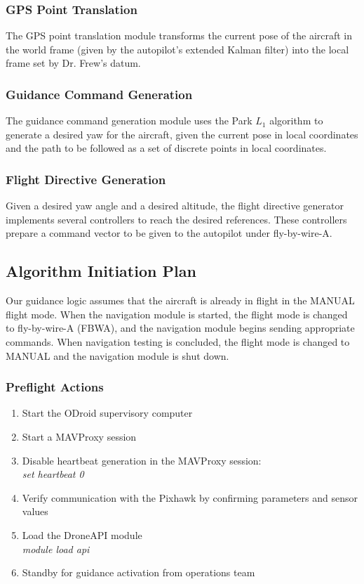 \documentclass{aiaa}
\begin{document}
\subsubsection{GPS Point Translation}
The GPS point translation module transforms the current pose of the aircraft in the world frame (given by the autopilot's extended Kalman filter) into the local frame set by Dr. Frew's datum.
  
\subsubsection{Guidance Command Generation}
The guidance command generation module uses the Park $L_1$ algorithm to generate a desired yaw for the aircraft, given the current pose in local coordinates and the path to be followed as a set of discrete points in local coordinates.

\subsubsection{Flight Directive Generation}
Given a desired yaw angle and a desired altitude, the flight directive generator implements several controllers to reach the desired references. These controllers prepare a command vector to be given to the autopilot under fly-by-wire-A. 
 
\subsection{Algorithm Initiation Plan}
Our guidance logic assumes that the aircraft is already in flight in the MANUAL flight mode. When the navigation module is started, the flight mode is changed to fly-by-wire-A (FBWA), and the navigation module begins sending appropriate commands. When navigation testing is concluded, the flight mode is changed to MANUAL and the navigation module is shut down.

\subsubsection{Preflight Actions}
\begin{enumerate}
	\item Start the ODroid supervisory computer
	\item Start a MAVProxy session
	\item Disable heartbeat generation in the MAVProxy session: \\
	\textit{set heartbeat 0}
	\item Verify communication with the Pixhawk by confirming parameters and sensor values
	\item Load the DroneAPI module \\
	\textit{module load api}
	\item Standby for guidance activation from operations team
\end{enumerate}
\end{document}

